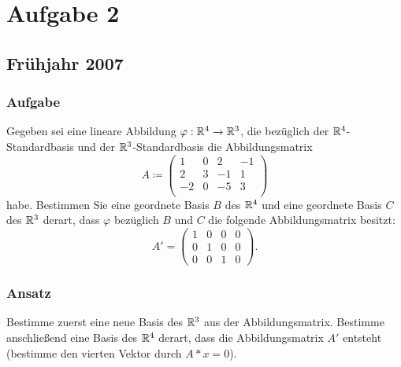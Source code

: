 \chapter{Aufgabe 2}

\section{Frühjahr 2007}

\subsection{Aufgabe}
Gegeben sei eine lineare Abbildung \( \varphi: \mathbb{R}^4 \to \mathbb{R}^3 \), die bezüglich der \( \mathbb{R}^4 \)-Standardbasis und der \( \mathbb{R}^3 \)-Standardbasis die Abbildungsmatrix
\begin{equation*}
	A \coloneqq \begin{pmatrix}
		1 & 0 & 2 & -1 \\
		2 & 3 & -1 & 1 \\
		-2 & 0 & -5 & 3 \\
	\end{pmatrix}
\end{equation*}
habe. Bestimmen Sie eine geordnete Basis \( B \) des \( \mathbb{R}^4 \) und eine geordnete Basis \( C \) des \( \mathbb{R}^3 \) derart, dass \( \varphi \) bezüglich \( B \) und \( C \) die folgende Abbildungsmatrix besitzt:
\begin{equation*}
	A' = \begin{pmatrix}
		1 & 0 & 0 & 0 \\
		0 & 1 & 0 & 0 \\
		0 & 0 & 1 & 0
	\end{pmatrix}\text{.}
\end{equation*}

\subsection{Ansatz}
Bestimme zuerst eine neue Basis des \( \mathbb{R}^3 \) aus der Abbildungsmatrix. Bestimme anschließend eine Basis des \( \mathbb{R}^4 \) derart, dass die Abbildungsmatrix \( A' \) entsteht (bestimme den vierten Vektor durch \( A * x = 0 \)).


